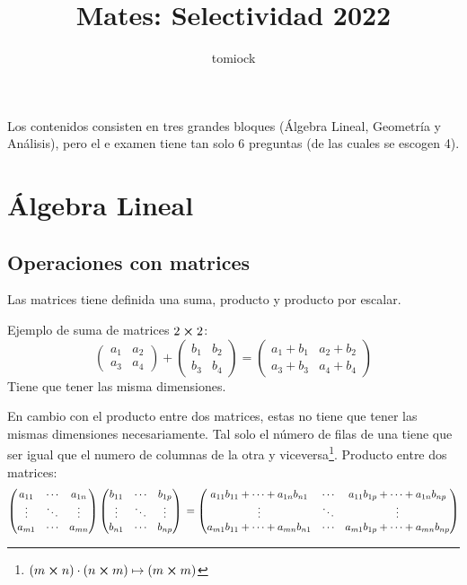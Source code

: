 \documentclass[arial,a4paper,print]{article}
\title{Mates: Selectividad 2022}
\author{tomiock}
\begin{document}
\maketitle

Los contenidos consisten en tres grandes bloques (Álgebra Lineal, Geometría y Análisis), pero el e examen tiene tan solo 6 preguntas (de las cuales se escogen 4). 

\section{Álgebra Lineal}
\subsection{Operaciones con matrices}

Las matrices tiene definida una suma, producto y producto por escalar.

Ejemplo de suma de matrices $2\cross2$:
\begin{equation*}
	\begin{pmatrix}
		a_{1} & a_{2} \\
		a_{3} & a_{4}
	\end{pmatrix} +
	\begin{pmatrix}
		b_{1} & b_{2} \\
		b_{3} & b_{4}
	\end{pmatrix} = 
	\begin{pmatrix}
		a_{1} + b_{1} & a_{2} + b_{2} \\
		a_{3} + b_{3} & a_{4} + b_{4}
	\end{pmatrix}
\end{equation*}
Tiene que tener las misma dimensiones. 

En cambio con el producto entre dos matrices, estas no tiene que tener las mismas dimensiones necesariamente. Tal solo el número de filas de una tiene que ser igual que el numero de columnas de la otra y viceversa\footnote{$(m\cross n ) \cdot (n\cross m) \mapsto (m\cross m)$}. Producto entre dos matrices: 
\begin{equation*}
\begin{pmatrix}
	a_{1 1} & \cdots & a_{1 n} \\
	\vdots & \ddots & \vdots \\
	a_{m 1} & \cdots & a_{m n}
\end{pmatrix} 
\begin{pmatrix}
	b_{1 1} & \cdots & b_{1 p} \\
	\vdots & \ddots & \vdots \\
	b_{n 1} & \cdots & b_{n p}
\end{pmatrix} \\
=
\begin{pmatrix}
	a_{11}b_{11}+ \cdots +a_{1n}b_{n1} & \cdots & a_{11}b_{1p}+ \cdots +a_{1n}b_{np} \\
	\vdots & \ddots & \vdots \\
	a_{m1}b_{11}+ \cdots +a_{mn}b_{n1} & \cdots & a_{m1}b_{1p}+ \cdots +a_{mn}b_{np}
\end{pmatrix}
\end{equation*}
\end{document}

